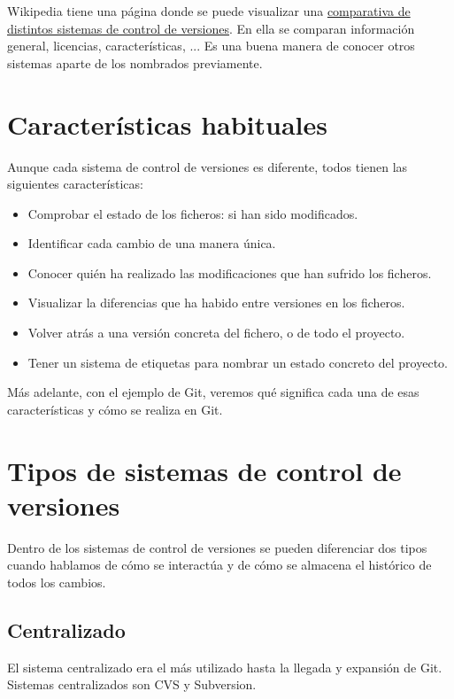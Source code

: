 Wikipedia tiene una página donde se puede visualizar una \href{https://en.wikipedia.org/wiki/Comparison_of_version-control_software}{comparativa de distintos sistemas de control de versiones}. En ella se comparan información general, licencias, características, ... Es una buena manera de conocer otros sistemas aparte de los nombrados previamente.


\chapter{Características habituales}

Aunque cada sistema de control de versiones es diferente, todos tienen las siguientes características:

\begin{itemize}
    \item Comprobar el estado de los ficheros: si han sido modificados.
    \item Identificar cada cambio de una manera única.
    \item Conocer quién ha realizado las modificaciones que han sufrido los ficheros.
    \item Visualizar la diferencias que ha habido entre versiones en los ficheros.
    \item Volver atrás a una versión concreta del fichero, o de todo el proyecto.
    \item Tener un sistema de etiquetas para nombrar un estado concreto del proyecto.
\end{itemize}

Más adelante, con el ejemplo de Git, veremos qué significa cada una de esas características y cómo se realiza en Git.

\chapter{Tipos de sistemas de control de versiones}

Dentro de los sistemas de control de versiones se pueden diferenciar dos tipos cuando hablamos de cómo se interactúa y de cómo se almacena el histórico de todos los cambios.

\section{Centralizado}

El sistema centralizado era el más utilizado hasta la llegada y expansión de Git. Sistemas centralizados son CVS y Subversion.

